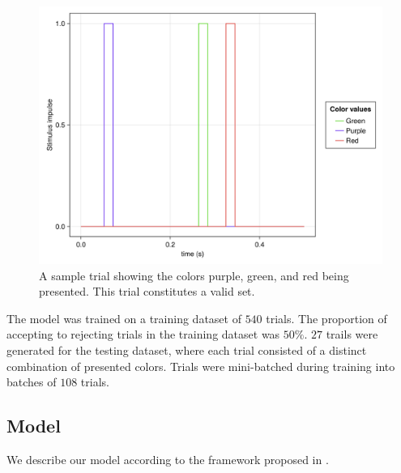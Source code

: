 \documentclass[conference]{IEEEtran}
\begin{document}
\begin{figure}[htbp]
\centerline{\includegraphics[scale=0.10]{example_trial.png}}
\caption{A sample trial showing the colors purple, green, and red being presented. This trial constitutes a valid set.}
\label{trial}
\end{figure}

The model was trained on a training dataset of $540$ trials. The proportion of accepting to rejecting trials in the training dataset was $50\%$. $27$ trails were generated for the testing dataset, where each trial consisted of a distinct combination of presented colors. Trials were mini-batched during training into batches of $108$ trials.

\subsection{Model}
\label{ctrnnmodel}

We describe our model according to the framework proposed in \cite{richards2019deep}.
\end{document}
